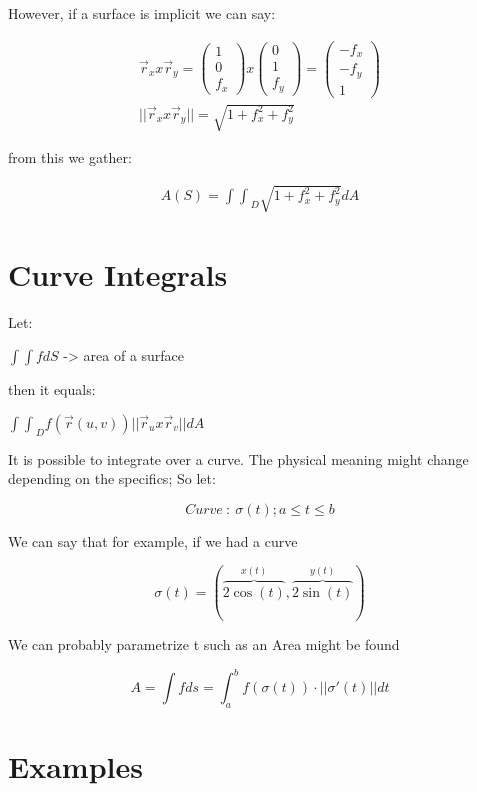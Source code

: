 \documentclass[11pt,fleqn]{book} %
\begin{document}
However, if a surface is implicit we can say:

\begin{gather}
    \vec{r}_x x \vec{r}_y = \begin{pmatrix}
        1\\0\\f_x
    \end{pmatrix} x \begin{pmatrix}
        0\\1\\f_y
    \end{pmatrix} = \begin{pmatrix}
        - f_x \\ - f_y \\ 1
    \end{pmatrix}\\
    ||\vec{r}_x x \vec{r}_y|| = \sqrt{1 + f_x^2 + f_y^2}
\end{gather}

from this we gather:

\begin{gather}
    A(S) = {\int\int}_D \sqrt{1 + f_x^2 + f_y^2} dA
\end{gather}


\section{Curve Integrals}

Let:

$\int\int f dS$ -> area of a surface

then it equals:

${\int\int}_D f(\vec{r}(u,v)) ||\vec{r}_u x \vec{r}_v|| dA$

It is possible to integrate over a curve. The physical meaning might change depending on the specifics;
So let:

$$ Curve \ : \ \sigma(t) ; a \leq t \leq b$$

We can say that for example, if we had a curve 

$$\sigma(t) = (\overbrace{2\cos(t)}^{x(t)}, \overbrace{2\sin(t)}^{y(t)}) $$

We can probably parametrize t such as an Area might be found

$$A = \int f ds = \int_a^b f(\sigma(t)) \cdot ||\sigma ' (t)|| dt $$


\section{Examples}
\end{document}
